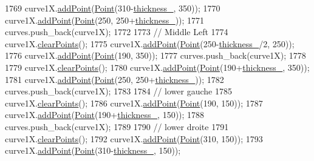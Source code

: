 \begin{DoxyCode}
1769     curve1X.\mbox{\hyperlink{class_bezier_curve_a38d16c18b36ae45619b05e26e226cf34}{addPoint}}(\mbox{\hyperlink{class_point}{Point}}(310-\mbox{\hyperlink{class_font_v1_aed8040e76be9a52833627b92f0fb4e5f}{thickness\_}}, 350));
1770     curve1X.\mbox{\hyperlink{class_bezier_curve_a38d16c18b36ae45619b05e26e226cf34}{addPoint}}(\mbox{\hyperlink{class_point}{Point}}(250, 250+\mbox{\hyperlink{class_font_v1_aed8040e76be9a52833627b92f0fb4e5f}{thickness\_}}));
1771     curves.push\_back(curve1X);
1772 
1773     \textcolor{comment}{// Middle Left}
1774     curve1X.\mbox{\hyperlink{class_bezier_curve_a0ba8ce66d5af5971ae6a1b506029728e}{clearPoints}}();
1775     curve1X.\mbox{\hyperlink{class_bezier_curve_a38d16c18b36ae45619b05e26e226cf34}{addPoint}}(\mbox{\hyperlink{class_point}{Point}}(250-\mbox{\hyperlink{class_font_v1_aed8040e76be9a52833627b92f0fb4e5f}{thickness\_}}/2, 250));
1776     curve1X.\mbox{\hyperlink{class_bezier_curve_a38d16c18b36ae45619b05e26e226cf34}{addPoint}}(\mbox{\hyperlink{class_point}{Point}}(190, 350));
1777     curves.push\_back(curve1X);
1778 
1779     curve1X.\mbox{\hyperlink{class_bezier_curve_a0ba8ce66d5af5971ae6a1b506029728e}{clearPoints}}();
1780     curve1X.\mbox{\hyperlink{class_bezier_curve_a38d16c18b36ae45619b05e26e226cf34}{addPoint}}(\mbox{\hyperlink{class_point}{Point}}(190+\mbox{\hyperlink{class_font_v1_aed8040e76be9a52833627b92f0fb4e5f}{thickness\_}}, 350));
1781     curve1X.\mbox{\hyperlink{class_bezier_curve_a38d16c18b36ae45619b05e26e226cf34}{addPoint}}(\mbox{\hyperlink{class_point}{Point}}(250, 250+\mbox{\hyperlink{class_font_v1_aed8040e76be9a52833627b92f0fb4e5f}{thickness\_}}));
1782     curves.push\_back(curve1X);
1783 
1784     \textcolor{comment}{// lower gauche}
1785     curve1X.\mbox{\hyperlink{class_bezier_curve_a0ba8ce66d5af5971ae6a1b506029728e}{clearPoints}}();
1786     curve1X.\mbox{\hyperlink{class_bezier_curve_a38d16c18b36ae45619b05e26e226cf34}{addPoint}}(\mbox{\hyperlink{class_point}{Point}}(190, 150));
1787     curve1X.\mbox{\hyperlink{class_bezier_curve_a38d16c18b36ae45619b05e26e226cf34}{addPoint}}(\mbox{\hyperlink{class_point}{Point}}(190+\mbox{\hyperlink{class_font_v1_aed8040e76be9a52833627b92f0fb4e5f}{thickness\_}}, 150));
1788     curves.push\_back(curve1X);
1789 
1790     \textcolor{comment}{// lower droite}
1791     curve1X.\mbox{\hyperlink{class_bezier_curve_a0ba8ce66d5af5971ae6a1b506029728e}{clearPoints}}();
1792     curve1X.\mbox{\hyperlink{class_bezier_curve_a38d16c18b36ae45619b05e26e226cf34}{addPoint}}(\mbox{\hyperlink{class_point}{Point}}(310, 150));
1793     curve1X.\mbox{\hyperlink{class_bezier_curve_a38d16c18b36ae45619b05e26e226cf34}{addPoint}}(\mbox{\hyperlink{class_point}{Point}}(310-\mbox{\hyperlink{class_font_v1_aed8040e76be9a52833627b92f0fb4e5f}{thickness\_}}, 150));

\end{DoxyCode}
